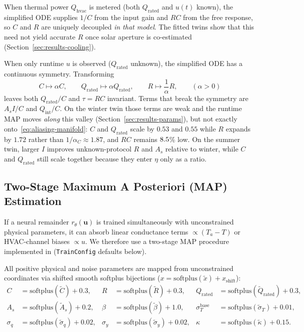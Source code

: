 \documentclass[11pt,letterpaper]{article}
\begin{document}
When thermal power $Q_\mathrm{hvac}$ is metered (both $Q_\mathrm{rated}$ and $u(t)$ known), the simplified ODE supplies $1/C$ from the input gain and $RC$ from the free response, so $C$ and $R$ are uniquely decoupled \emph{in that model}. The fitted twins show that this need not yield accurate $R$ once solar aperture is co-estimated (Section~\ref{sec:results-cooling}).

When only runtime $u$ is observed ($Q_\mathrm{rated}$ unknown), the simplified ODE has a continuous symmetry. Transforming
\begin{equation}
\label{eq:aliasing-manifold}
C \mapsto \alpha C, \qquad Q_\mathrm{rated} \mapsto \alpha Q_\mathrm{rated}, \qquad R \mapsto \frac{1}{\alpha} R, \qquad (\alpha > 0)
\end{equation}
leaves both $Q_\mathrm{rated}/C$ and $\tau=RC$ invariant. Terms that break the symmetry are $A_s I/C$ and $Q_\mathrm{int}/C$. On the winter twin those terms are weak and the runtime MAP moves \emph{along} this valley (Section~\ref{sec:results-params}), but not exactly onto~\eqref{eq:aliasing-manifold}: $C$ and $Q_\mathrm{rated}$ scale by $0.53$ and $0.55$ while $R$ expands by $1.72$ rather than $1/\alpha_C\approx 1.87$, and $RC$ remains $8.5$\% low. On the summer twin, larger $I$ improves unknown-protocol $R$ and $A_s$ relative to winter, while $C$ and $Q_\mathrm{rated}$ still scale together because they enter $\eta$ only as a ratio.

\subsection{Two-Stage Maximum A Posteriori (MAP) Estimation}
\label{sec:id-twostage}
If a neural remainder $r_\theta(\bm{u})$ is trained simultaneously with unconstrained physical parameters, it can absorb linear conductance terms $\propto (T_a - T)$ or HVAC-channel biases $\propto u$. We therefore use a two-stage MAP procedure implemented in  (\texttt{TrainConfig} defaults below).

All positive physical and noise parameters are mapped from unconstrained coordinates via shifted smooth softplus bijections ($x = \mathrm{softplus}(\tilde{x}) + x_\mathrm{shift}$):
\begin{align}
\label{eq:softplus-maps}
C &= \mathrm{softplus}(\tilde{C}) + 0.3, & R &= \mathrm{softplus}(\tilde{R}) + 0.3, & Q_\mathrm{rated} &= \mathrm{softplus}(\tilde{Q}_\mathrm{rated}) + 0.3, \nonumber \\
A_s &= \mathrm{softplus}(\tilde{A}_s) + 0.2, & \beta &= \mathrm{softplus}(\tilde{\beta}) + 1.0, & \sigma_T^{\mathrm{base}} &= \mathrm{softplus}(\tilde{\sigma}_T) + 0.01, \nonumber \\
\sigma_q &= \mathrm{softplus}(\tilde{\sigma}_q) + 0.02, & \sigma_y &= \mathrm{softplus}(\tilde{\sigma}_y) + 0.02, & \kappa &= \mathrm{softplus}(\tilde{\kappa}) + 0.15.
\end{align}
\end{document}

